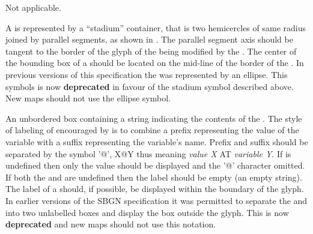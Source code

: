 \begin{glyphDescription}

\glyphSboTerm Not applicable.

\glyphContainer A  is represented by a
``stadium'' container, that is two hemicercles of same radius joined
by parallel segments, as shown in .  The parallel
segment axis should be tangent to the border of the glyph of the
 being modified by the . The center
of the bounding box of a  should be located on
the mid-line of the border of the . In previous versions of
this specification the  was represented by an
ellipse. This symbols is now \textbf{deprecated} in favour of the stadium
symbol described above. New \PD maps should not use the ellipse symbol.

\glyphLabel An unbordered box containing a string indicating the
contents of the . The style of labeling of
 encouraged by \SBGNPDLone is to combine a
prefix representing the value of the variable with a suffix
representing the variable's name.  Prefix and suffix should be
separated by the symbol '@', X@Y thus meaning \emph{value X} AT
\emph{variable Y}. If  is undefined then only the value
should be displayed and the '@' character omitted.  If both the
 and  are undefined then the label should
be empty (\ie an empty string). The label of a 
should, if possible, be displayed within the boundary of the glyph. In
earlier versions of the SBGN specification it was permitted to
separate the  and  into two unlabelled
boxes and display the  box outside the  glyph. This is now \textbf{deprecated} and new \PD maps
should not use this notation.




\end{glyphDescription}
